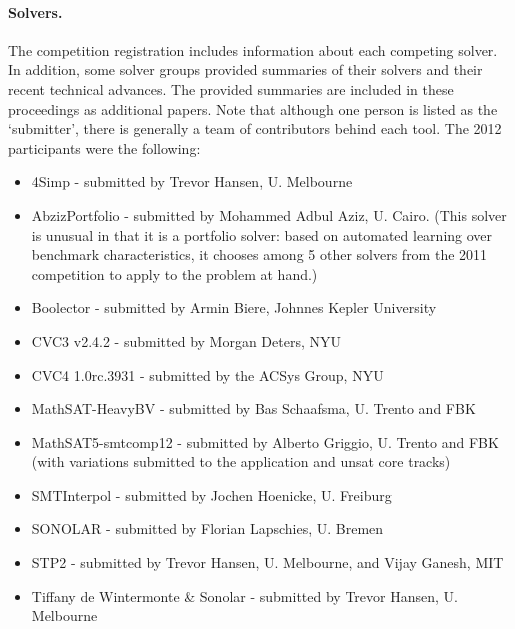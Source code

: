 \documentclass{llncs}
\begin{document}
\paragraph{Solvers.} The competition registration includes information about each competing solver. In addition, some solver groups provided summaries of their solvers and their recent technical advances. The provided summaries are included in these proceedings as additional papers. Note that although one person is listed as the `submitter', there is generally a team of contributors behind each tool. The 2012 participants were the following:
\begin{itemize}
\item 4Simp - submitted by Trevor Hansen, U. Melbourne
\item AbzizPortfolio - submitted by Mohammed Adbul Aziz, U. Cairo. (This solver is unusual in that it is a portfolio solver: based on automated learning over benchmark characteristics, it chooses among 5 other solvers from the 2011 competition to apply to the problem at hand.)
\item Boolector - submitted by Armin Biere, Johnnes Kepler University
\item CVC3 v2.4.2 - submitted by Morgan Deters, NYU
\item CVC4 1.0rc.3931 - submitted by the ACSys Group, NYU
\item MathSAT-HeavyBV - submitted by Bas Schaafsma, U. Trento and FBK
\item MathSAT5-smtcomp12 - submitted by Alberto Griggio, U. Trento and FBK (with variations submitted to the application and unsat core tracks)
\item SMTInterpol - submitted by Jochen Hoenicke, U. Freiburg
\item SONOLAR - submitted by Florian Lapschies, U. Bremen
\item STP2 - submitted by Trevor Hansen, U. Melbourne, and Vijay Ganesh, MIT
\item Tiffany de Wintermonte \& Sonolar - submitted by Trevor Hansen, U. Melbourne
\end{itemize}
\end{document}
